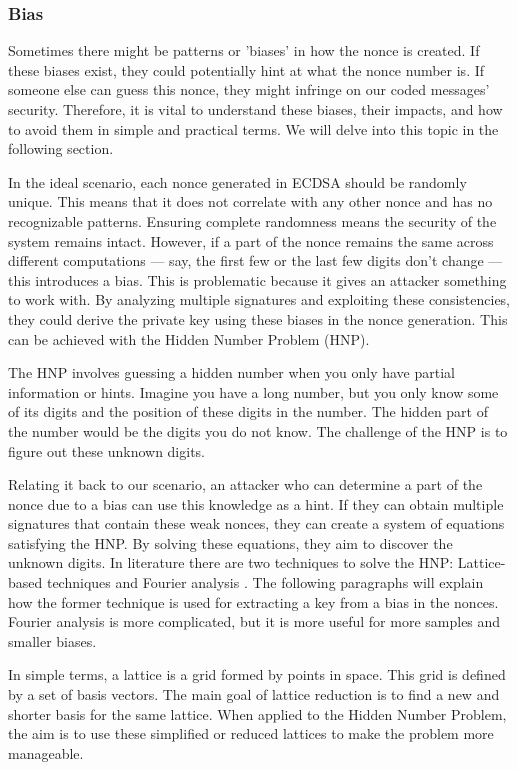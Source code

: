 \subsubsection{Bias}
\label{subsubsection:bias}
Sometimes there might be patterns or 'biases' in how the nonce is created. If these biases exist, they could potentially hint at what the nonce number is. If someone else can guess this nonce, they might infringe on our coded messages' security. Therefore, it is vital to understand these biases, their impacts, and how to avoid them in simple and practical terms. We will delve into this topic in the following section.

In the ideal scenario, each nonce generated in ECDSA should be randomly unique. This means that it does not correlate with any other nonce and has no recognizable patterns. Ensuring complete randomness means the security of the system remains intact. However, if a part of the nonce remains the same across different computations — say, the first few or the last few digits don't change — this introduces a bias. This is problematic because it gives an attacker something to work with. By analyzing multiple signatures and exploiting these consistencies, they could derive the private key using these biases in the nonce generation. This can be achieved with the Hidden Number Problem (HNP).

The HNP involves guessing a hidden number when you only have partial information or hints. Imagine you have a long number, but you only know some of its digits and the position of these digits in the number. The hidden part of the number would be the digits you do not know. The challenge of the HNP is to figure out these unknown digits. \cite{cryptoeprint:2020/1506}

Relating it back to our scenario, an attacker who can determine a part of the nonce due to a bias can use this knowledge as a hint. If they can obtain multiple signatures that contain these weak nonces, they can create a system of equations satisfying the HNP. By solving these equations, they aim to discover the unknown digits. In literature there are two techniques to solve the HNP: Lattice-based techniques and Fourier analysis \cite{cryptoeprint:2019/023}. The following paragraphs will explain how the former technique is used for extracting a key from a bias in the nonces. Fourier analysis is more complicated, but it is more useful for more samples and smaller biases.

In simple terms, a lattice is a grid formed by points in space. This grid is defined by a set of basis vectors. The main goal of lattice reduction is to find a new and shorter basis for the same lattice. When applied to the Hidden Number Problem, the aim is to use these simplified or reduced lattices to make the problem more manageable.

